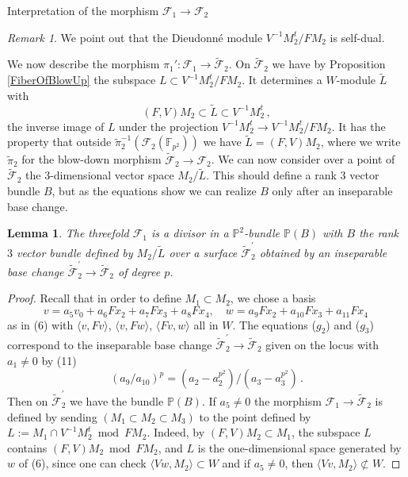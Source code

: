 \documentclass[11pt]{amsart}
\numberwithin{equation}{section}
\newcommand{\FF}{\mathbb F}
\newcommand{\PP}{\mathbb P}
\newtheorem{lemma}[theorem]{Lemma}
\theoremstyle{definition}
\theoremstyle{remark}
\newtheorem{remark}[theorem]{Remark}
\begin{document}
\begin{section}{Interpretation of the
morphism $\mathcal{F}_1 \to \mathcal{F}_2$}
\begin{remark}
We point out that the Dieudonn\'e module $V^{-1}M_2^t/FM_2$ is self-dual.
\end{remark}


We now describe the morphism $\pi_1' : \mathcal{F}_1 \to \tilde{\mathcal{F}}_2$.
On $\tilde{\mathcal{F}}_2$ we have by Proposition \ref{FiberOfBlowUp} 
the subspace $L \subset V^{-1}M_2^t/FM_2$. It determines a
$W$-module $\tilde{L}$ with
$$
(F,V) M_2 \subset \tilde{L} \subset V^{-1}M_2^t\, ,
$$
the inverse image of $L$ under the projection $V^{-1}M_2^t \to V^{-1}M_2^t/FM_2$.
It has the property that outside $\tilde{\pi}_2^{-1}(\mathcal{F}_2({\FF}_{p^2}))$ we have
$\tilde{L}=(F,V)M_2$, where we write $\tilde{\pi}_2$ for the blow-down morphism
$\tilde{\mathcal{F}}_2 \to \mathcal{F}_2$.
We can now consider over a point of $\tilde{\mathcal{F}}_2$ 
the $3$-dimensional vector space
$ M_2/\tilde{L}$. This should define
a rank $3$ vector bundle $B$, but as the equations show 
we can realize $B$ only after an inseparable base change.

\begin{lemma}
The threefold $\mathcal{F}_1$ is a divisor in a ${\PP}^2$-bundle ${\PP}(B)$
with $B$ the rank $3$ vector bundle defined by $M_2/\tilde{L}$
over a surface $\tilde{\mathcal{F}}_2^{\prime}$ obtained by an inseparable base change 
$\tilde{\mathcal{F}}_2^{\prime} \to\tilde{\mathcal{F}}_2$
of degree $p$.
\end{lemma}
\begin{proof}
Recall that in order to define $M_1 \subset M_2$, we chose a basis 
$$
v=a_5v_0+a_6Fx_2+a_7Fx_3+a_8Fx_4, \quad
w=a_9Fx_2+a_{10}Fx_3+a_{11}Fx_4 \, 
$$
as in (6) with $\langle v,Fv\rangle$, $\langle v,Fw\rangle$, $\langle Fv,w\rangle$
all in $W$. 
The equations ($g_2$) and ($g_3$) correspond to the inseparable 
base change $\tilde{\mathcal{F}}_2^{\prime} \to\tilde{\mathcal{F}}_2$
given on the locus with $a_1\neq 0$ by (11) 
$$
(a_9/a_{10})^p= (a_2-a_2^{p^2})/(a_3-a_3^{p^2})\, .
$$
Then on $\tilde{\mathcal{F}}_2^{\prime}$ we have the bundle ${\PP}(B)$.
If $a_5\neq 0$ the morphism
${\mathcal F}_1 \to \tilde{\mathcal F}_2$ is defined by sending
$(M_1 \subset M_2 \subset M_3)$ to the point defined by $L:=M_1 \cap V^{-1}M_2^t \bmod FM_2$.
Indeed,
by $(F,V)M_2 \subset M_1$, the subspace $L$ contains $(F,V)M_2 \bmod FM_2$,
and $L$ is the one-dimensional space generated by $w$ of (6),
since one can check $\langle Vw, M_2 \rangle\subset W$ and if $a_5 \ne0$, 
then $\langle Vv, M_2 \rangle \not\subset W$.


\end{proof}
\end{section}
\end{document}
